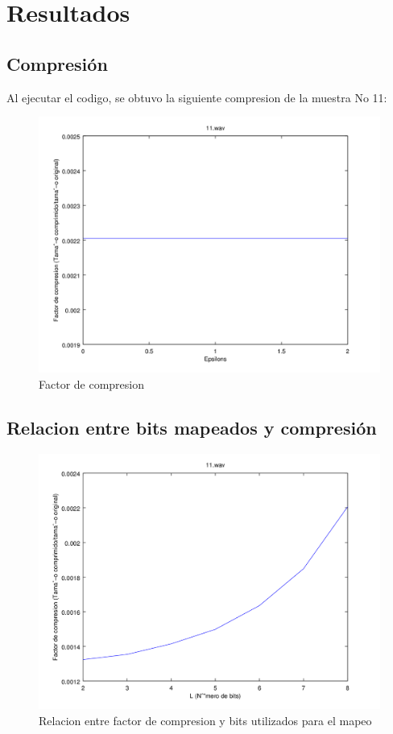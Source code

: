\documentclass[spanish]{scrartcl}
\begin{document}
\section{Resultados}

\subsection{Compresión}
Al ejecutar el codigo, se obtuvo la siguiente compresion de la muestra No 11:

\begin{figure}[!htbp]
    \centering
    \includegraphics[interpolate=false, scale=0.09]{plots/11_epsi_compression}
    \caption{Factor de compresion}
    \label{fig:comp_fact}
\end{figure}

\subsection{Relacion entre bits mapeados y compresión}

\begin{figure}[!htbp]
    \centering
    \includegraphics[interpolate=false, scale=0.09]{plots/11_bits_compression}
    \caption{Relacion entre factor de compresion y bits utilizados para el mapeo}
    \label{fig:fact_bits}
\end{figure}
\end{document}
